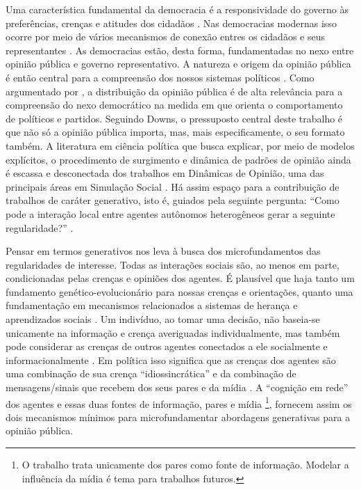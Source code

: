 Uma característica fundamental da democracia é a responsividade do governo às
preferências, crenças e atitudes dos cidadãos
\cite{dahl1989democracy,bartels2003democracy}. Nas democracias modernas isso
ocorre por meio de vários mecanismos de conexão entres os cidadãos e seus
representantes \cite{dahl1989democracy, schumpeter2013capitalism}. As
democracias estão, desta forma, fundamentadas no nexo entre opinião pública e
governo representativo. A natureza e origem da opinião pública é então central
para a compreensão dos nossos sistemas políticos \cite{berelson1952democratic}.
Como argumentado por ,  a distribuição da opinião
pública é de alta relevância para a compreensão do nexo democrático na medida em
que orienta o comportamento de políticos e partidos. Seguindo Downs, o
pressuposto central deste trabalho é que não só a opinião pública importa, mas,
mais especificamente, o seu formato também. A literatura em ciência política que
busca explicar, por meio de modelos explícitos, o procedimento de surgimento e
dinâmica de padrões de opinião ainda é escassa e desconectada dos trabalhos em
Dinâmicas de Opinião, uma das principais áreas em Simulação Social
\cite{lorenz2017modeling, laver2011party, hauke2017recent}. Há assim espaço para
a contribuição de trabalhos de caráter generativo, isto é, guiados pela seguinte
pergunta: ``Como pode a interação local entre agentes autônomos heterogêneos
gerar a seguinte regularidade?'' \cite{epstein2006generative}.

Pensar em termos generativos nos leva à busca dos microfundamentos das
regularidades de interesse. Todas as interações sociais são, ao menos em parte,
condicionadas pelas crenças e opiniões dos agentes. É plausível que haja tanto
um fundamento genético-evolucionário para nossas crenças e orientações, quanto
uma fundamentação em mecanismos relacionados a sistemas de herança e
aprendizados sociais \cite{jablonka2014evolution, fowler2008biology,
  fowler2013defense}. Um indivíduo, ao tomar uma decisão,  não baseia-se unicamente
na informação e crença averiguadas individualmente, mas também pode considerar
as crenças de outros agentes conectados a ele socialmente e informacionalmente
\cite{gintis2016individuality}. Em política isso significa que as crenças dos
agentes são uma combinação de sua crença ``idiossincrática'' e da combinação de
mensagens/sinais que recebem dos seus pares e da mídia
\cite{barabas2004deliberation,ryan2011social}. A ``cognição em rede''
\cite{gintis2016individuality} dos agentes e essas duas fontes de informação,
pares e mídia \footnote{O trabalho trata unicamente dos pares como fonte de
  informação. Modelar a influência da mídia é tema para trabalhos futuros.},
fornecem assim os dois mecanismos mínimos para microfundamentar abordagens
generativas para a opinião pública.


